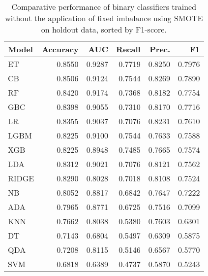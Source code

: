 \begin{table}
\caption{Comparative performance of binary classifiers trained without the application of fixed imbalance using SMOTE on holdout data, sorted by F1-score.}
\label{tbl:binary_False_SMOTE_ho_res_top_models_df}
\begin{tabular}{lrrrrr}
\toprule
Model & Accuracy & AUC & Recall & Prec. & F1 \\
\midrule
ET & 0.8550 & 0.9287 & 0.7719 & 0.8250 & 0.7976 \\
CB & 0.8506 & 0.9124 & 0.7544 & 0.8269 & 0.7890 \\
RF & 0.8420 & 0.9174 & 0.7368 & 0.8182 & 0.7754 \\
GBC & 0.8398 & 0.9055 & 0.7310 & 0.8170 & 0.7716 \\
LR & 0.8355 & 0.9037 & 0.7076 & 0.8231 & 0.7610 \\
LGBM & 0.8225 & 0.9100 & 0.7544 & 0.7633 & 0.7588 \\
XGB & 0.8225 & 0.8948 & 0.7485 & 0.7665 & 0.7574 \\
LDA & 0.8312 & 0.9021 & 0.7076 & 0.8121 & 0.7562 \\
RIDGE & 0.8290 & 0.8028 & 0.7018 & 0.8108 & 0.7524 \\
NB & 0.8052 & 0.8817 & 0.6842 & 0.7647 & 0.7222 \\
ADA & 0.7965 & 0.8771 & 0.6725 & 0.7516 & 0.7099 \\
KNN & 0.7662 & 0.8038 & 0.5380 & 0.7603 & 0.6301 \\
DT & 0.7143 & 0.6804 & 0.5497 & 0.6309 & 0.5875 \\
QDA & 0.7208 & 0.8115 & 0.5146 & 0.6567 & 0.5770 \\
SVM & 0.6818 & 0.6389 & 0.4737 & 0.5870 & 0.5243 \\
\bottomrule
\end{tabular}
\end{table}
